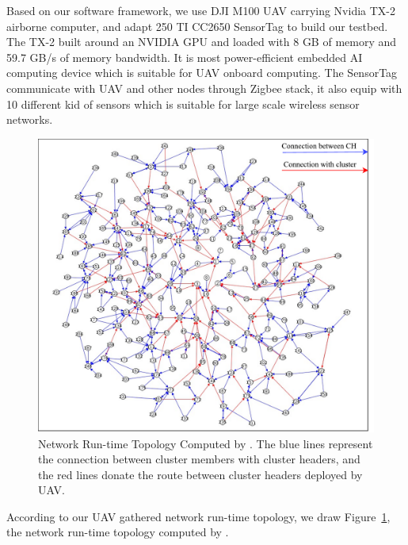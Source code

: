 Based on our software framework, we use DJI M100 UAV carrying Nvidia TX-2 airborne
computer, and adapt 250 TI CC2650 SensorTag to build our testbed. The TX-2 built around an NVIDIA GPU 
and loaded with 8 GB of memory and 59.7 GB/s of memory bandwidth. It is most power-efficient embedded 
AI computing device which is suitable for UAV onboard computing. The SensorTag communicate with UAV and
other nodes through Zigbee stack, it also equip with 10 different kid of sensors which is suitable for 
large scale wireless sensor networks.

\begin{figure}[htbp]
	\centering
	\includegraphics[width=.85\columnwidth]{Figure/topology}
	\vspace{-0.1in}
	\caption{Network Run-time Topology Computed by {\sdn}. \textnormal{The blue lines
represent the connection between cluster members with cluster headers, and the
red lines donate the route between cluster headers deployed by UAV.}}
	
	\label{topology}
	\vspace{-0.1in}
\end{figure}

According to our UAV gathered network run-time topology, we draw Figure~\ref{topology}, the network run-time topology computed by {\sdn}.

